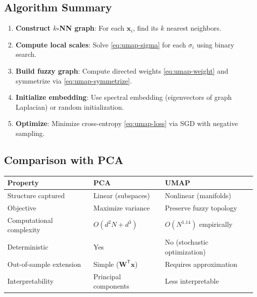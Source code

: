 \subsection{Algorithm Summary}

\begin{enumerate}
  \item \textbf{Construct $k$-NN graph}: For each $\mathbf{x}_i$, find its $k$ nearest neighbors.
  \item \textbf{Compute local scales}: Solve \eqref{eq:umap-sigma} for each $\sigma_i$ using binary search.
  \item \textbf{Build fuzzy graph}: Compute directed weights \eqref{eq:umap-weight} and symmetrize via \eqref{eq:umap-symmetrize}.
  \item \textbf{Initialize embedding}: Use spectral embedding (eigenvectors of graph Laplacian) or random initialization.
  \item \textbf{Optimize}: Minimize cross-entropy \eqref{eq:umap-loss} via SGD with negative sampling.
\end{enumerate}

\subsection{Comparison with PCA}

\begin{center}
  \begin{tabular}{lll}
    \hline
    \textbf{Property}        & \textbf{PCA}          & \textbf{UMAP}                    \\
    \hline
    Structure captured       & Linear (subspaces)    & Nonlinear (manifolds)            \\
    Objective                & Maximize variance     & Preserve fuzzy topology          \\
    Computational complexity & $O(d^2 N + d^3)$      & $O(N^{1.14})$ empirically        \\
    Deterministic            & Yes                   & No (stochastic optimization)     \\
    Out-of-sample extension  & Simple ($\mathbf{W}^{\mathsf{T}}\mathbf{x}$) & Requires approximation \\
    Interpretability         & Principal components  & Less interpretable               \\
    \hline
  \end{tabular}
\end{center}

